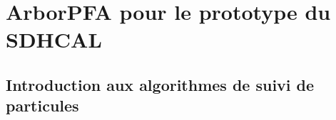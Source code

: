 \documentclass[8pt]{beamer}
\begin{document}


  \section{ArborPFA pour le prototype du SDHCAL}

  \begin{frame}
  \frametitle{\secname}
    \tableofcontents[currentsection]
  \end{frame}

  \subsection{Introduction aux algorithmes de suivi de particules}
\end{document}
